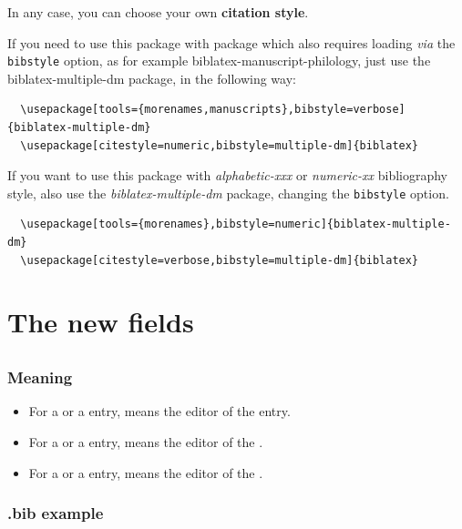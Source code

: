 \documentclass{ltxdockit}[2011/03/25]
\begin{document}
In any case, you can choose your own \textbf{citation style}.
 
If you need to use this package with package which also requires loading \emph{via} the \verb+bibstyle+ option, as for example biblatex-manuscript-philology, just use the biblatex-multiple-dm package, in the following way:

\begin{verbatim}
  \usepackage[tools={morenames,manuscripts},bibstyle=verbose]{biblatex-multiple-dm}
  \usepackage[citestyle=numeric,bibstyle=multiple-dm]{biblatex}
\end{verbatim}

If you want to use this package with \emph{alphabetic-xxx} or \emph{numeric-xx} bibliography style, also use the \emph{biblatex-multiple-dm} package, changing the \verb+bibstyle+ option.

\begin{verbatim}
  \usepackage[tools={morenames},bibstyle=numeric]{biblatex-multiple-dm}
  \usepackage[citestyle=verbose,bibstyle=multiple-dm]{biblatex}
\end{verbatim}
\section{The new fields}

\subsection{}

\subsubsection{Meaning}
\begin{itemize}
	\item For a  or a  entry, means the editor of the  entry.
	\item For a  or a  entry, means the editor of the .
	\item For a  or a  entry, means the editor of the .
\end{itemize}


\subsubsection{.bib example}
\end{document}
